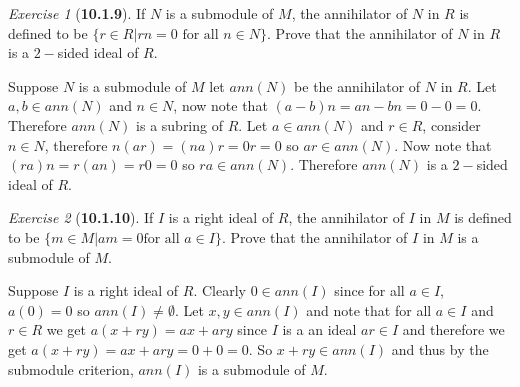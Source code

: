 \documentclass[12pt]{amsart}
\makeatletter
\theoremstyle{remark}
\newtheorem*{exercise}{Exercise}%
\renewenvironment{proof}[1][\proofname]{\par\doublespacing
  \pushQED{\qed}%
  \normalfont \topsep6\p@\@plus6\p@\relax
  \list{}{%
    \settowidth{\leftmargin}{\itshape\proofname:\hskip\labelsep}%
    \setlength{\labelwidth}{0pt}%
    \setlength{\itemindent}{-\leftmargin}%
  }%
  \item[\hskip\labelsep\itshape#1\@addpunct{:}]\ignorespaces
}{%
  \popQED\endlist\@endpefalse
  \singlespacing
}
\theoremstyle{mycomment}
\makeatother
\begin{document}
\begin{exercise}[\textbf{10.1.9}] If $N$ is a submodule of $M$, the annihilator of $N$ in $R$ is defined to be 
  $\{r \in R| rn = 0 \text{ for all } n \in N\}$. Prove that the annihilator of $N$ in $R$ is a $2-$sided ideal of $R$. 
  \begin{proof} Suppose $N$ is a submodule of $M$ let $ann(N)$ be the annihilator of $N$ in $R$. Let $a, b \in ann(N)$ and $n \in N$, now
    note that $(a - b)n = an - bn = 0 - 0 = 0$. Therefore $ann(N)$ is a subring of $R$. 
    Let $a \in ann(N)$ and $r \in R$, consider
    $n \in N$, therefore $n(ar) = (na)r = 0r = 0$ so $ar \in ann(N)$. Now note that $(ra)n = r(an) = r0 = 0$ so $ra \in ann(N)$.
    Therefore $ann(N)$ is a $2-$sided ideal of $R$.

  \end{proof}
\end{exercise}
\vspace{.5in}


\begin{exercise}[\textbf{10.1.10}] If $I$ is a right ideal of $R$, the annihilator of $I$ in $M$ is defined to be
  $\{m \in M | am = 0 \text{for all }a \in I\}$. Prove that the annihilator of $I$ in $M$ is a submodule of $M$.
  \begin{proof} Suppose $I$ is a right ideal of $R$. Clearly $0 \in ann(I)$ since for all $a \in I$, $a(0) = 0$ so 
    $ann(I) \neq \emptyset$. Let $x, y \in ann(I)$ and note that for all $a \in I$ and $r \in R$ we get $a(x + ry) = ax + ary$
    since $I$ is a an ideal $ar \in I$ and therefore we get $a(x + ry) = ax + ary = 0 + 0 = 0$. So $x + ry \in ann(I)$ and thus by the submodule
    criterion, $ann(I)$ is a submodule of $M$. 

  \end{proof}
\end{exercise}
\vspace{.5in}
\end{document}
